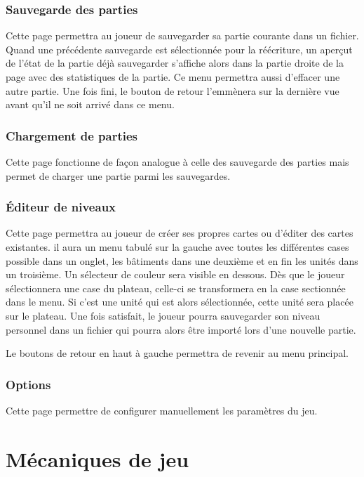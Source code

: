 \documentclass[a4paper,10pt]{article} %
\begin{document}
\subsubsection{Sauvegarde des parties}
Cette page permettra au joueur de sauvegarder sa partie courante dans un fichier. Quand une précédente sauvegarde est sélectionnée pour la réécriture, un aperçut de l'état de la partie déjà sauvegarder s'affiche alors dans la partie droite de la page avec des statistiques de la partie. Ce menu permettra aussi d'effacer une autre partie. Une fois fini, le bouton de retour l'emmènera sur la dernière vue avant qu'il ne soit arrivé dans ce menu.

\subsubsection{Chargement de parties}
Cette page fonctionne de façon analogue à celle des sauvegarde des parties mais permet de charger une partie parmi les sauvegardes.

\subsubsection{Éditeur de niveaux}
Cette page permettra au joueur de créer ses propres cartes ou d'éditer des cartes existantes. il aura un menu tabulé sur la gauche avec toutes les différentes cases possible dans un onglet, les bâtiments dans une deuxième et en fin les unités dans un troisième. Un sélecteur de couleur sera visible en dessous. Dès que le joueur sélectionnera une case du plateau, celle-ci se transformera en la case sectionnée dans le menu. Si c'est une unité qui est alors sélectionnée, cette unité sera placée sur le plateau. Une fois satisfait, le joueur pourra sauvegarder son niveau personnel dans un fichier qui pourra alors être importé lors d'une nouvelle partie. 

Le boutons de retour en haut à gauche permettra de revenir au menu principal.

\subsubsection{Options}
Cette page permettre de configurer manuellement les paramètres du jeu.

\section{Mécaniques de jeu}
\end{document}
